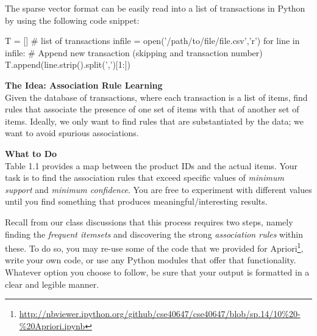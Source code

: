 \documentclass[paper=a4, fontsize=11pt]{scrartcl} %
\numberwithin{equation}{section} %
\numberwithin{figure}{section} %
\numberwithin{table}{section} %
\begin{document}
The sparse vector format can be easily read into a list of transactions in Python by using the following code snippet:

\vspace{6pt}

\begin{adjustbox}{minipage=0.8\textwidth,margin=0pt \smallskipamount,center}
\begin{python}
T = [] # list of transactions
infile = open('/path/to/file/file.csv','r')
for line in infile:
      # Append new transaction (skipping \n and transaction number)
      T.append(line.strip().split(',')[1:])
\end{python}
\end{adjustbox}

\vspace{8pt}

\textbf{The Idea:  Association Rule Learning}\\
Given the database of transactions, where each transaction is a list of items, find rules that associate the presence of one set of items with that of another set of items. Ideally, we only want to find rules that are substantiated by the data; we want to avoid spurious associations.

\vspace{8pt}

\textbf{What to Do}\\
Table 1.1 provides a map between the product IDs and the actual items. Your task is to find the association rules that exceed specific values of \textit{minimum support} and \textit{minimum confidence}. You are free to experiment with different values until you find something that produces meaningful/interesting results. 

\vspace{6pt}

Recall from our class discussions that this process requires two steps, namely finding the \textit{frequent itemsets} and discovering the strong \textit{association rules} within these. To do so, you may re-use some of the code that we provided for Apriori\footnote{\href{http://nbviewer.ipython.org/github/cse40647/cse40647/blob/sp.14/10\%20-\%20Apriori.ipynb}{http://nbviewer.ipython.org/github/cse40647/cse40647/blob/sp.14/10\%20-\%20Apriori.ipynb}}, write your own code, or use any Python modules that offer that functionality. Whatever option you choose to follow, be sure that your output is formatted in a clear and legible manner.

\vspace{8pt}
\end{document}
